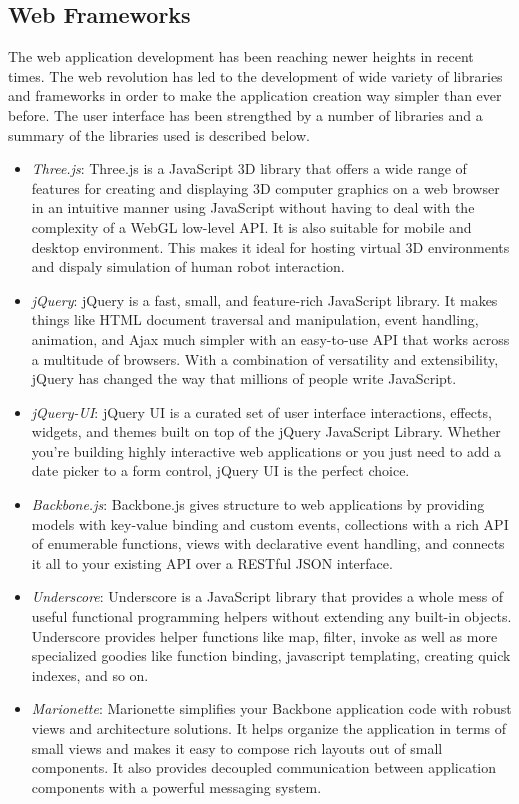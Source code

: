 \subsection{Web Frameworks}
	The web application development has been reaching newer heights in recent times. The web revolution has led to the development of wide variety of libraries and frameworks in order to make the application creation way simpler than ever before. The user interface has been strengthed by a number of libraries and a summary of the libraries used is described below.

\begin{itemize}
\item \emph{Three.js}: Three.js is a JavaScript 3D library that offers a wide range of features for creating and displaying 3D computer graphics on a web browser in an intuitive manner using JavaScript without having to deal with the complexity of a WebGL low-level API. It is also suitable for mobile and desktop environment. This makes it ideal for hosting virtual 3D environments and dispaly simulation of human robot interaction.
\item \emph{jQuery}: jQuery is a fast, small, and feature-rich JavaScript library. It makes things like HTML document traversal and manipulation, event handling, animation, and Ajax much simpler with an easy-to-use API that works across a multitude of browsers. With a combination of versatility and extensibility, jQuery has changed the way that millions of people write JavaScript.
\item \emph{jQuery-UI}: jQuery UI is a curated set of user interface interactions, effects, widgets, and themes built on top of the jQuery JavaScript Library. Whether you're building highly interactive web applications or you just need to add a date picker to a form control, jQuery UI is the perfect choice.
\item \emph{Backbone.js}: Backbone.js gives structure to web applications by providing models with key-value binding and custom events, collections with a rich API of enumerable functions, views with declarative event handling, and connects it all to your existing API over a RESTful JSON interface.
\item \emph{Underscore}: Underscore is a JavaScript library that provides a whole mess of useful functional programming helpers without extending any built-in objects. Underscore provides helper functions like map, filter, invoke as well as more specialized goodies like function binding, javascript templating, creating quick indexes, and so on.
\item \emph{Marionette}: Marionette simplifies your Backbone application code with robust views and architecture solutions. It helps organize the application in terms of small views and makes it easy to compose rich layouts out of small components. It also provides decoupled communication between application components with a powerful messaging system.
\end{itemize}

